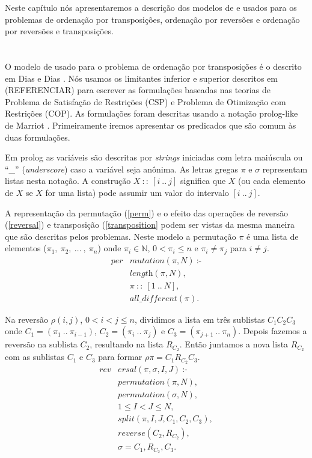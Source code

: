 Neste capítulo nós apresentaremos a descrição dos modelos de \pr{} e
\pli{} usados para os problemas de ordenação por transposições,
ordenação por reversões e ordenação por reversões e transposições.

\section{\PR}
\label{sec:cp}
O modelo de \pr{} usado para o problema de ordenação por transposições
é o descrito em Dias e Dias \cite{DiasDias*2009}. Nós usamos os
limitantes inferior e superior descritos em (REFERENCIAR) para
escrever as formulações baseadas nas teorias de Problema de Satisfação
de Restrições (CSP) e Problema de Otimização com Restrições (COP). As
formulações foram descritas usando a notação prolog-like de
Marriot \cite{Marriott*1998}. Primeiramente iremos apresentar os
predicados que são comum às duas formulações.

Em prolog as variáveis são descritas por \textit{strings} iniciadas
com letra maiúscula ou ``\_'' (\textit{underscore}) caso a variável
seja anônima. As letras gregas $\pi$ e $\sigma$ representam listas
nesta notação. A construção $X~::~[i~..~j]$ significa que $X$ (ou cada
elemento de $X$ se $X$ for uma lista) pode assumir um valor do
intervalo $[i~..~j]$.

A representação da permutação (\ref{perm}) e o efeito das operações de
reversão (\ref{reversal}) e transposição (\ref{transposition} podem
ser vistas da mesma maneira que são descritas pelos problemas. Neste
modelo a permutação $\pi$ é uma lista de elementos
($\pi_{1},~\pi_{2},~\ldots~,~\pi_{n}$) onde $\pi_{i} \in \mathbb{N}$,
$0 < \pi_{i} \le n$ e $\pi_{i} \neq \pi_{j}$ para $i \neq j$.
\begin{align}
  \label{perm}
  \textit{per}&\textit{mutation}(\pi, N)~\text{:-} \nonumber\\
  &\textit{length}(\pi, N), \\ 
  &\pi~::~[1~..~N], \nonumber\\
  &\textit{all\_different}(\pi). \nonumber
\end{align}

Na reversão $\rho(i,j)$, $0 < i < j \leq n$, dividimos a lista em três
sublistas $C_{1}C_{2}C_{3}$ onde $C_{1} = (\pi_{1}~..~\pi_{i-1})$,
$C_{2} = (\pi_{i}~..~\pi_{j})$ e $C_{3} =
(\pi_{j+1}~..~\pi_{n})$. Depois fazemos a reversão na sublista
$C_{2}$, resultando na lista $R_{C_{2}}$. Então juntamos a nova lista
$R_{C_{2}}$ com as sublistas $C_{1}$ e $C_{3}$ para formar $\rho\pi =
C_{1}R_{C_{2}}C_{3}$.
\begin{align}
  \label{reversal}
  \textit{rev}&\textit{ersal}(\pi, \sigma, I, J)~\text{:-} \nonumber\\
  &\textit{permutation}(\pi, N), \nonumber\\
  &\textit{permutation}(\sigma, N), \nonumber \\
  &1 \le I < J \le N, \\
  &\textit{split}(\pi, I, J, C_{1}, C_{2}, C_{3}), \nonumber\\
  &\textit{reverse}(C_{2}, R_{C_{2}}), \nonumber \\
  &\sigma = C_{1}, R_{C_{2}}, C_{3}. \nonumber
\end{align}

